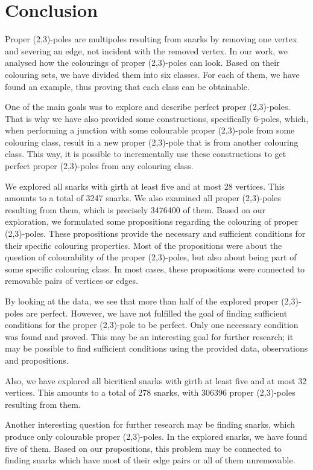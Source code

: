 \section*{Conclusion}

Proper (2,3)-poles are multipoles resulting from snarks by removing one vertex and severing an edge, not incident with the removed vertex. In our work, we analysed how the colourings of proper (2,3)-poles can look. Based on their colouring sets, we have divided them into six classes. For each of them, we have found an example, thus proving that each class can be obtainable.

One of the main goals was to explore and describe perfect proper (2,3)-poles. That is why we have also provided some constructions, specifically 6-poles, which, when performing a junction with some colourable proper (2,3)-pole from some colouring class, result in a new proper (2,3)-pole that is from another colouring class. This way, it is possible to incrementally use these constructions to get perfect proper (2,3)-poles from any colouring class.

We explored all snarks with girth at least five and at most 28 vertices. This amounts to a total of 3247 snarks. We also examined all proper (2,3)-poles resulting from them, which is precisely 3476400 of them. Based on our exploration, we formulated some propositions regarding the colouring of proper (2,3)-poles. These propositions provide the necessary and sufficient conditions for their specific colouring properties. Most of the propositions were about the question of colourability of the proper (2,3)-poles, but also about being part of some specific colouring class. In most cases, these propositions were connected to removable pairs of vertices or edges.

By looking at the data, we see that more than half of the explored proper (2,3)-poles are perfect. However, we have not fulfilled the goal of finding sufficient conditions for the proper (2,3)-pole to be perfect. Only one necessary condition was found and proved. This may be an interesting goal for further research; it may be possible to find sufficient conditions using the provided data, observations and propositions.

Also, we have explored all bicritical snarks with girth at least five and at most 32 vertices. This amounts to a total of 278 snarks, with 306396 proper (2,3)-poles resulting from them.

Another interesting question for further research may be finding snarks, which produce only colourable proper (2,3)-poles. In the explored snarks, we have found five of them. Based on our propositions, this problem may be connected to finding snarks which have most of their edge pairs or all of them unremovable.